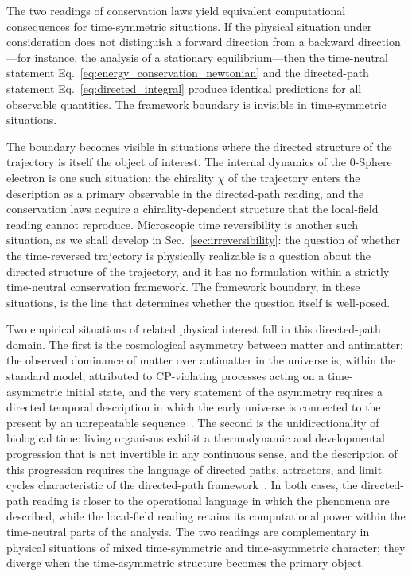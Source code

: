 \documentclass[%
 reprint, amsmath,amssymb, aps, prb, ]{revtex4-2}
\numberwithin{equation}{section}
\begin{document}
The two readings of conservation laws yield equivalent computational consequences for time-symmetric situations. If the physical situation under consideration does not distinguish a forward direction from a backward direction---for instance, the analysis of a stationary equilibrium---then the time-neutral statement Eq.~\eqref{eq:energy_conservation_newtonian} and the directed-path statement Eq.~\eqref{eq:directed_integral} produce identical predictions for all observable quantities. The framework boundary is invisible in time-symmetric situations.

The boundary becomes visible in situations where the directed structure of the trajectory is itself the object of interest. The internal dynamics of the 0-Sphere electron is one such situation: the chirality $\chi$ of the trajectory enters the description as a primary observable in the directed-path reading, and the conservation laws acquire a chirality-dependent structure that the local-field reading cannot reproduce. Microscopic time reversibility is another such situation, as we shall develop in Sec.~\ref{sec:irreversibility}: the question of whether the time-reversed trajectory is physically realizable is a question about the directed structure of the trajectory, and it has no formulation within a strictly time-neutral conservation framework. The framework boundary, in these situations, is the line that determines whether the question itself is well-posed.

Two empirical situations of related physical interest fall in this directed-path domain. The first is the cosmological asymmetry between matter and antimatter: the observed dominance of matter over antimatter in the universe is, within the standard model, attributed to CP-violating processes acting on a time-asymmetric initial state, and the very statement of the asymmetry requires a directed temporal description in which the early universe is connected to the present by an unrepeatable sequence~\cite{Sakharov1967}. The second is the unidirectionality of biological time: living organisms exhibit a thermodynamic and developmental progression that is not invertible in any continuous sense, and the description of this progression requires the language of directed paths, attractors, and limit cycles characteristic of the directed-path framework~\cite{Prigogine1984}. In both cases, the directed-path reading is closer to the operational language in which the phenomena are described, while the local-field reading retains its computational power within the time-neutral parts of the analysis. The two readings are complementary in physical situations of mixed time-symmetric and time-asymmetric character; they diverge when the time-asymmetric structure becomes the primary object.
\end{document}
